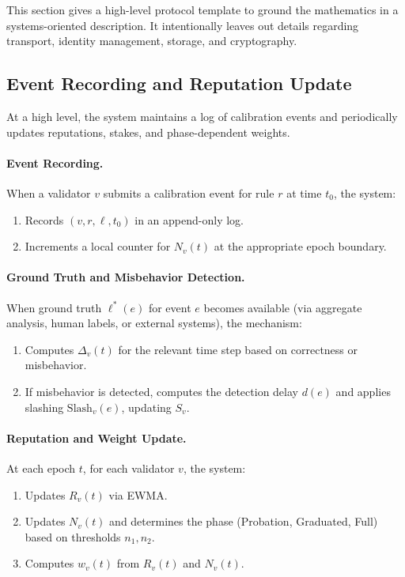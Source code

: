 \documentclass[11pt]{article}
\theoremstyle{plain}
\theoremstyle{definition}
\begin{document}
This section gives a high-level protocol template to ground the mathematics in a systems-oriented description. It intentionally leaves out details regarding transport, identity management, storage, and cryptography.

\subsection{Event Recording and Reputation Update}

At a high level, the system maintains a log of calibration events and periodically updates reputations, stakes, and phase-dependent weights.

\paragraph{Event Recording.}
When a validator \(v\) submits a calibration event for rule \(r\) at time \(t_0\), the system:
\begin{enumerate}[leftmargin=*]
  \item Records \((v, r, \ell, t_0)\) in an append-only log.
  \item Increments a local counter for \(N_v(t)\) at the appropriate epoch boundary.
\end{enumerate}

\paragraph{Ground Truth and Misbehavior Detection.}
When ground truth \(\ell^*(e)\) for event \(e\) becomes available (via aggregate analysis, human labels, or external systems), the mechanism:
\begin{enumerate}[leftmargin=*]
  \item Computes \(\Delta_v(t)\) for the relevant time step based on correctness or misbehavior.
  \item If misbehavior is detected, computes the detection delay \(d(e)\) and applies slashing \(\mathrm{Slash}_v(e)\), updating \(S_v\).
\end{enumerate}

\paragraph{Reputation and Weight Update.}
At each epoch \(t\), for each validator \(v\), the system:
\begin{enumerate}[leftmargin=*]
  \item Updates \(R_v(t)\) via EWMA.
  \item Updates \(N_v(t)\) and determines the phase (Probation, Graduated, Full) based on thresholds \(n_1,n_2\).
  \item Computes \(w_v(t)\) from \(R_v(t)\) and \(N_v(t)\).
\end{enumerate}
\end{document}
